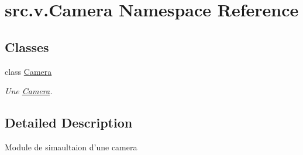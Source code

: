 \hypertarget{namespacesrc_1_1v_1_1_camera}{}\section{src.\+v.\+Camera Namespace Reference}
\label{namespacesrc_1_1v_1_1_camera}
\subsection*{Classes}
\begin{DoxyCompactItemize}
\item 
class \hyperlink{classsrc_1_1v_1_1_camera_1_1_camera}{Camera}
\begin{DoxyCompactList}\small\item\em Une \hyperlink{classsrc_1_1v_1_1_camera_1_1_camera}{Camera}. \end{DoxyCompactList}\end{DoxyCompactItemize}


\subsection{Detailed Description}
\begin{DoxyVerb}    Module de simaultaion d'une camera
\end{DoxyVerb}
 